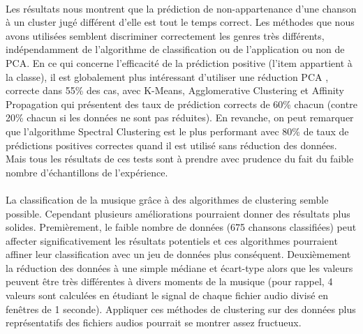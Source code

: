 \documentclass{ir}
\begin{document}
\paragraph{}
Les résultats nous montrent que la prédiction de non-appartenance d’une chanson à un cluster jugé différent d’elle
est tout le temps correct. Les méthodes que nous avons utilisées semblent discriminer correctement les genres très 
différents, indépendamment de l’algorithme de classification ou de l’application ou non de PCA. En ce qui 
concerne l'efficacité de la prédiction positive (l’item appartient à la classe), il est globalement plus 
intéressant d’utiliser une réduction PCA , correcte dans 55\% des cas, avec K-Means, Agglomerative Clustering et 
Affinity Propagation qui présentent des taux de prédiction corrects de 60\% chacun (contre 20\% chacun si les 
données ne sont pas réduites). En revanche, on peut remarquer que l’algorithme Spectral Clustering est le plus 
performant avec 80\% de taux de prédictions positives correctes quand il est utilisé sans réduction des données. 
Mais tous les résultats de ces tests sont à prendre avec prudence du fait du faible nombre d'échantillons de 
l’expérience.

\paragraph{}

La classification de la musique grâce à des algorithmes de clustering semble possible. Cependant plusieurs améliorations 
pourraient donner des résultats plus solides. Premièrement, le faible nombre de données (675 chansons classifiées) 
peut affecter significativement les résultats potentiels et ces algorithmes pourraient affiner leur 
classification avec un jeu de données plus conséquent. Deuxièmement la réduction des données à une simple 
médiane et écart-type alors que les valeurs peuvent être très différentes à divers moments de la musique (pour 
rappel, 4 valeurs sont calculées en étudiant le signal de chaque fichier audio divisé en fenêtres de 1 seconde). 
Appliquer ces méthodes de clustering sur des données plus représentatifs des fichiers audios pourrait se montrer 
assez fructueux.
\end{document}
